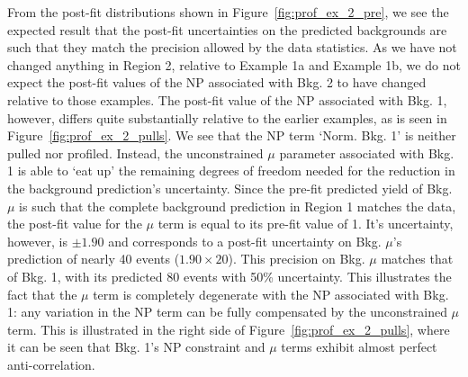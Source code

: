 From the post-fit distributions shown in Figure~\ref{fig:prof_ex_2_pre}, we see the
expected result that the post-fit uncertainties on the predicted backgrounds
are such that they match the precision allowed by the data statistics.
As we have not changed anything in Region 2, relative to Example 1a and Example 1b,
we do not expect the post-fit values of the NP associated with Bkg. 2 to have changed relative
to those examples.
The post-fit value of the NP associated with Bkg. 1, however, differs quite substantially
relative to the earlier examples, as is seen in Figure~\ref{fig:prof_ex_2_pulls}.
We see that the NP term `Norm. Bkg. 1' is neither pulled nor profiled.
Instead, the unconstrained $\mu$ parameter associated with Bkg. 1 is able to `eat up'
the remaining degrees of freedom needed for the reduction in the background prediction's uncertainty.
Since the pre-fit predicted yield of Bkg. $\mu$ is such that the complete background
prediction in Region 1 matches the data, the post-fit value for the $\mu$ term is equal to its
pre-fit value of 1.
It's uncertainty, however, is $\pm 1.90$ and corresponds to a post-fit uncertainty
on Bkg. $\mu$'s prediction of nearly 40 events ($1.90 \times 20$).
This precision on Bkg. $\mu$ matches that of Bkg. 1, with its predicted 80 events
with 50\% uncertainty.
This illustrates the fact that the $\mu$ term is completely degenerate with the NP associated with Bkg. 1:
any variation in the NP term can be fully compensated by the unconstrained $\mu$ term.
This is illustrated in the right side of Figure~\ref{fig:prof_ex_2_pulls},
where it can be seen that Bkg. 1's NP constraint and $\mu$ terms exhibit almost perfect anti-correlation.

